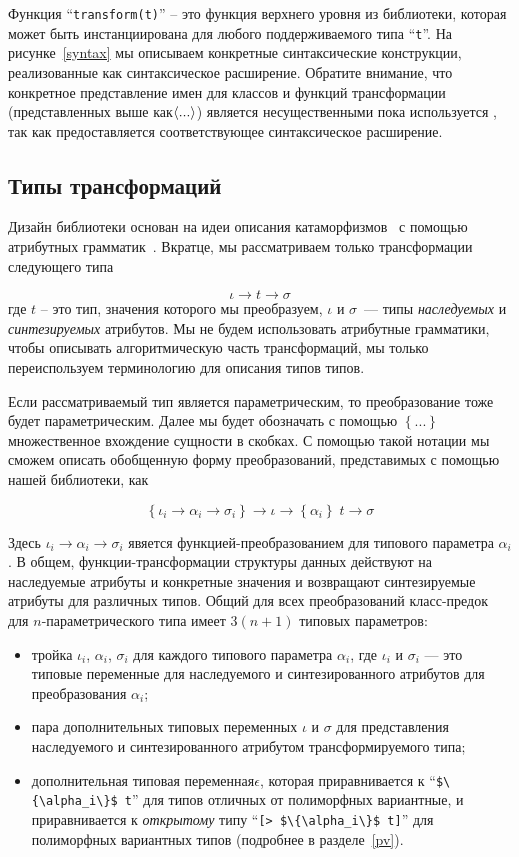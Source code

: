 Функция ``\lstinline{transform(t)}'' -- это функция верхнего уровня из библиотеки, которая может быть инстанциирована для любого поддерживаемого типа  ``\lstinline{t}''. На рисунке~\ref{syntax} мы описываем конкретные синтаксические конструкции, реализованные как синтаксическое расширение. Обратите внимание, что конкретное представление имен для классов и функций трансформации (представленных выше как$\left<...\right>$) является несущественными пока используется , так как предоставляется соответствующее синтаксическое расширение.

\subsection{Типы трансформаций}

Дизайн библиотеки основан на идеи описания катаморфизмов~\cite{Bananas} с помощью атрибутных 
грамматик~\cite{AGKnuth,AGSwierstra,ObjectAlgebrasAttribute}.
Вкратце, мы рассматриваем только трансформации следующего типа

\[
\iota \to t \to \sigma
\]
где $t$ -- это тип, значения которого мы преобразуем, $\iota$ и $\sigma$~--- типы \emph{наследуемых} и \emph{синтезируемых} атрибутов. 
Мы не будем использовать атрибутные грамматики, чтобы описывать алгоритмическую часть трансформаций, мы только переиспользуем терминологию для описания типов типов. 

Если рассматриваемый тип является параметрическим, то преобразование тоже будет параметрическим. Далее мы будет обозначать с помощью
$\left\{...\right\}$ множественное вхождение сущности в скобках. С помощью такой нотации мы сможем описать обобщенную форму преобразований, представимых с помощью нашей библиотеки, как

\[
  \left\{\iota_i \to \alpha_i \to \sigma_i\right\}\to\iota \to\left\{\alpha_i\right\}\;t \to \sigma
\]

Здесь $\iota_i\to\alpha_i\to\sigma_i$ явяется функцией-преобразованием для типового параметра $\alpha_i$. В общем, функции-трансформации структуры данных действуют на наследуемые атрибуты и конкретные значения и возвращают синтезируемые атрибуты для различных типов. Общий для всех преобразований класс-предок для $n$-параметрического типа имеет $3(n+1)$ типовых параметров:

\begin{itemize}
\item тройка $\iota_i$, $\alpha_i$, $\sigma_i$ для каждого типового параметра $\alpha_i$, где $\iota_i$ и $\sigma_i$ --- это типовые переменные для наследуемого и синтезированного атрибутов для преобразования  $\alpha_i$;
\item пара дополнительных типовых переменных $\iota$ и $\sigma$ для представления наследуемого и синтезированного атрибутом трансформируемого типа;
\item дополнительная типовая переменная$\epsilon$, которая приравнивается к ``\lstinline|$\{\alpha_i\}$ t|'' для типов отличных от полиморфных вариантные, и приравнивается к \emph{открытому} типу ``\lstinline|[> $\{\alpha_i\}$ t]|'' для полиморфных вариантных типов (подробнее в 
разделе~\ref{pv}).
\end{itemize}

